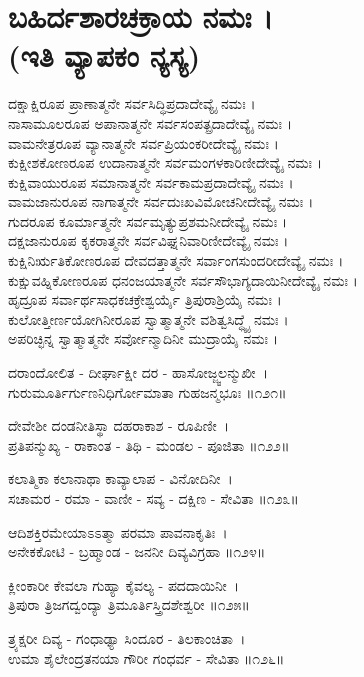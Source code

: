 \section{ಬಹಿರ್ದಶಾರಚಕ್ರಾಯ ನಮಃ ।\\ (ಇತಿ ವ್ಯಾಪಕಂ ನ್ಯಸ್ಯ)}
ದಕ್ಷಾಕ್ಷಿರೂಪ ಪ್ರಾಣಾತ್ಮನೇ ಸರ್ವಸಿದ್ಧಿಪ್ರದಾದೇವ್ಯೈ ನಮಃ ।\\
ನಾಸಾಮೂಲರೂಪ ಅಪಾನಾತ್ಮನೇ ಸರ್ವಸಂಪತ್ಪ್ರದಾದೇವ್ಯೈ ನಮಃ ।\\
ವಾಮನೇತ್ರರೂಪ ವ್ಯಾನಾತ್ಮನೇ ಸರ್ವಪ್ರಿಯಂಕರೀದೇವ್ಯೈ ನಮಃ ।\\
ಕುಕ್ಷೀಶಕೋಣರೂಪ ಉದಾನಾತ್ಮನೇ ಸರ್ವಮಂಗಳಕಾರಿಣೀದೇವ್ಯೈ ನಮಃ ।\\
ಕುಕ್ಷಿವಾಯುರೂಪ ಸಮಾನಾತ್ಮನೇ ಸರ್ವಕಾಮಪ್ರದಾದೇವ್ಯೈ ನಮಃ ।\\
ವಾಮಜಾನುರೂಪ ನಾಗಾತ್ಮನೇ ಸರ್ವದುಃಖವಿಮೋಚನೀದೇವ್ಯೈ ನಮಃ ।\\
ಗುದರೂಪ ಕೂರ್ಮಾತ್ಮನೇ ಸರ್ವಮೃತ್ಯುಪ್ರಶಮನೀದೇವ್ಯೈ ನಮಃ ।\\
ದಕ್ಷಜಾನುರೂಪ ಕೃಕರಾತ್ಮನೇ ಸರ್ವವಿಘ್ನನಿವಾರಿಣೀದೇವ್ಯೈ ನಮಃ ।\\
ಕುಕ್ಷಿನಿರ್ಋತಿಕೋಣರೂಪ ದೇವದತ್ತಾತ್ಮನೇ ಸರ್ವಾಂಗಸುಂದರೀದೇವ್ಯೈ ನಮಃ ।\\
ಕುಕ್ಷುವಹ್ನಿಕೋಣರೂಪ ಧನಂಜಯಾತ್ಮನೇ ಸರ್ವಸೌಭಾಗ್ಯದಾಯಿನೀದೇವ್ಯೈ ನಮಃ ।\\
ಹೃದ್ರೂಪ ಸರ್ವಾರ್ಥಸಾಧಕಚಕ್ರೇಶ್ವರ್ಯೈ ತ್ರಿಪುರಾಶ್ರಿಯೈ ನಮಃ ।\\
ಕುಲೋತ್ತೀರ್ಣಯೋಗಿನೀರೂಪ ಸ್ವಾತ್ಮಾತ್ಮನೇ ವಶಿತ್ವಸಿದ್ಧ್ಯೈ ನಮಃ ।\\
ಅಪರಿಚ್ಛಿನ್ನ ಸ್ವಾತ್ಮಾತ್ಮನೇ ಸರ್ವೋನ್ಮಾದಿನೀ ಮುದ್ರಾಯೈ ನಮಃ ।

ದರಾಂದೋಲಿತ - ದೀರ್ಘಾಕ್ಷೀ ದರ - ಹಾಸೋಜ್ಜ್ವಲನ್ಮುಖೀ~।\\
ಗುರುಮೂರ್ತಿರ್ಗುಣನಿಧಿರ್ಗೋಮಾತಾ ಗುಹಜನ್ಮಭೂಃ ॥೧೨೧॥

ದೇವೇಶೀ ದಂಡನೀತಿಸ್ಥಾ ದಹರಾಕಾಶ - ರೂಪಿಣೀ~।\\
ಪ್ರತಿಪನ್ಮುಖ್ಯ - ರಾಕಾಂತ - ತಿಥಿ - ಮಂಡಲ - ಪೂಜಿತಾ ॥೧೨೨॥

ಕಲಾತ್ಮಿಕಾ ಕಲಾನಾಥಾ ಕಾವ್ಯಾಲಾಪ - ವಿನೋದಿನೀ~।\\
ಸಚಾಮರ - ರಮಾ - ವಾಣೀ - ಸವ್ಯ - ದಕ್ಷಿಣ - ಸೇವಿತಾ ॥೧೨೩॥

ಆದಿಶಕ್ತಿರಮೇಯಾಽಽತ್ಮಾ ಪರಮಾ ಪಾವನಾಕೃತಿಃ~।\\
ಅನೇಕಕೋಟಿ - ಬ್ರಹ್ಮಾಂಡ - ಜನನೀ ದಿವ್ಯವಿಗ್ರಹಾ ॥೧೨೪॥

ಕ್ಲೀಂಕಾರೀ ಕೇವಲಾ ಗುಹ್ಯಾ ಕೈವಲ್ಯ - ಪದದಾಯಿನೀ~।\\
ತ್ರಿಪುರಾ ತ್ರಿಜಗದ್ವಂದ್ಯಾ ತ್ರಿಮೂರ್ತಿಸ್ತ್ರಿದಶೇಶ್ವರೀ ॥೧೨೫॥

ತ್ರ್ಯಕ್ಷರೀ ದಿವ್ಯ - ಗಂಧಾಢ್ಯಾ ಸಿಂದೂರ - ತಿಲಕಾಂಚಿತಾ~।\\
ಉಮಾ ಶೈಲೇಂದ್ರತನಯಾ ಗೌರೀ ಗಂಧರ್ವ - ಸೇವಿತಾ ॥೧೨೬॥

